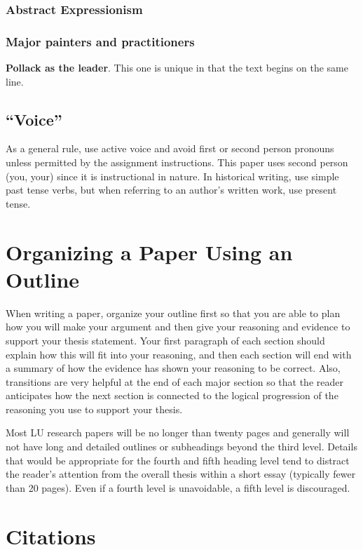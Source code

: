 \documentclass[raggedright]{turabian-researchpaper}
\newcommand*{\subsubsubsection}[1]{\subsubsection{\normalfont #1}}
\newcommand*{\subsubsubsubsection}[1]{\textbf{#1}}
\begin{document}
\subsubsection{Abstract Expressionism}

\subsubsubsection{Major painters and practitioners}

\subsubsubsubsection{Pollack as the leader}. This one is unique in that the text
begins on the same line.

\subsection{``Voice''}

As a general rule, use active voice and avoid first or second person pronouns
unless permitted by the assignment instructions. This paper uses second person
(you, your) since it is instructional in nature. In historical writing, use
simple past tense verbs, but when referring to an author's written work, use
present tense.

\section{Organizing a Paper Using an Outline}

When writing a paper, organize your outline first so that you are able to plan
how you will make your argument and then give your reasoning and evidence to
support your thesis statement. Your first paragraph of each section should
explain how this will fit into your reasoning, and then each section will end
with a summary of how the evidence has shown your reasoning to be correct. Also,
transitions are very helpful at the end of each major section so that the reader
anticipates how the next section is connected to the logical progression of the
reasoning you use to support your thesis.

Most LU research papers will be no longer than twenty pages and generally will
not have long and detailed outlines or subheadings beyond the third level.
Details that would be appropriate for the fourth and fifth heading level tend to
distract the reader's attention from the overall thesis within a short essay
(typically fewer than 20 pages). Even if a fourth level is unavoidable, a fifth
level is discouraged.

\section{Citations}
\end{document}
